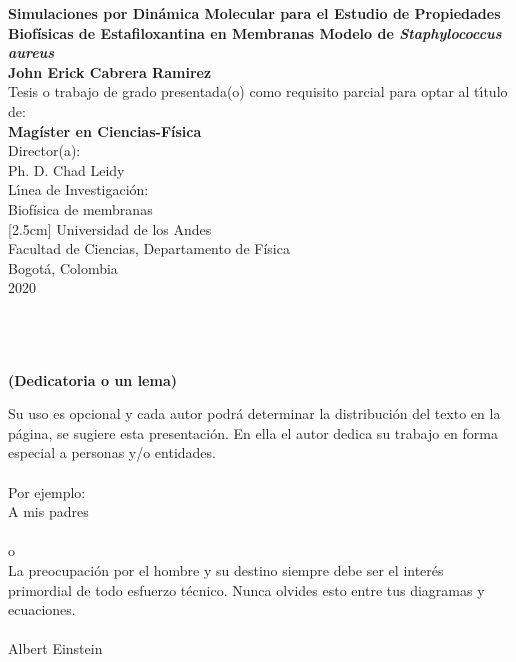 \newpage
\begin{center}
\thispagestyle{empty} \vspace*{-1cm} \textbf{\huge
Simulaciones por Din\'{a}mica Molecular para el Estudio de Propiedades Biof\'{i}sicas de Estafiloxantina en Membranas Modelo de \textit{Staphylococcus aureus}}\\[3.0cm]
\Large\textbf{John Erick Cabrera Ramirez}\\[3.0cm]
\small Tesis o trabajo de grado presentada(o) como requisito parcial para optar al
t\'{\i}tulo de:\\
\textbf{Mag\'{i}ster en Ciencias-F\'{i}sica}\\[2.0cm]
Director(a):\\
Ph. D. Chad Leidy\\[2.0cm]
L\'{\i}nea de Investigaci\'{o}n:\\
Biof\'{i}sica de membranas\\
[2.5cm]
Universidad de los Andes\\
Facultad de Ciencias, Departamento de F\'{i}sica\\
Bogot\'{a}, Colombia\\
2020\\
\end{center}

\newpage{\pagestyle{empty}\cleardoublepage}

\newpage
\thispagestyle{empty} \textbf{}\normalsize
\\\\\\%
\textbf{(Dedicatoria o un lema)}\\[4.0cm]

\begin{flushright}
\begin{minipage}{8cm}
    \noindent
        \small
        Su uso es opcional y cada autor podr\'{a} determinar la distribuci\'{o}n del texto en la p\'{a}gina, se sugiere esta presentaci\'{o}n. En ella el autor dedica su trabajo en forma especial a personas y/o entidades.\\[1.0cm]\\
        Por ejemplo:\\[1.0cm]
        A mis padres\\[1.0cm]\\
        o\\[1.0cm]
        La preocupaci\'{o}n por el hombre y su destino siempre debe ser el
        inter\'{e}s primordial de todo esfuerzo t\'{e}cnico. Nunca olvides esto
        entre tus diagramas y ecuaciones.\\\\
        Albert Einstein\\
\end{minipage}
\end{flushright}

